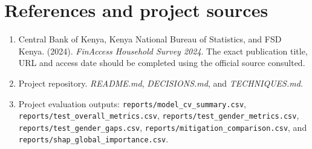 \documentclass[11pt,a4paper]{article}
\begin{document}
\section*{References and project sources}

\begin{enumerate}[leftmargin=*]
  \item Central Bank of Kenya, Kenya National Bureau of Statistics, and FSD Kenya. (2024). \textit{FinAccess Household Survey 2024}. The exact publication title, URL and access date should be completed using the official source consulted.
  \item Project repository. \textit{README.md}, \textit{DECISIONS.md}, and \textit{TECHNIQUES.md}.
  \item Project evaluation outputs: \texttt{reports/model\_cv\_summary.csv}, \texttt{reports/test\_overall\_metrics.csv}, \texttt{reports/test\_gender\_metrics.csv}, \texttt{reports/test\_gender\_gaps.csv}, \texttt{reports/mitigation\_comparison.csv}, and \texttt{reports/shap\_global\_importance.csv}.
\end{enumerate}
\end{document}
